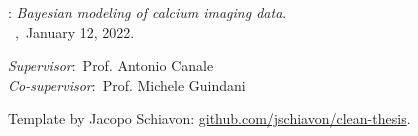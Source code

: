 \thispagestyle{empty}

\hfill

\vfill

\noindent\myName: \emph{Bayesian modeling of calcium imaging data}.\\
\textcopyright~\myLocation,~January 12, 2022.

\medskip
%
\noindent\textit{Supervisor}:~Prof. Antonio Canale \\
\noindent\textit{Co-supervisor}:~Prof. Michele Guindani \\

\medskip

\noindent Template by Jacopo Schiavon: \href{https://github.com/jschiavon/clean-thesis}{github.com/jschiavon/clean-thesis}.